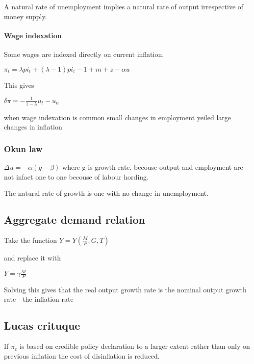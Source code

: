 \documentclass[,twocolumn]{article}
\let\oldparagraph\paragraph
\renewcommand{\paragraph}[1]{\oldparagraph{#1}\mbox{}}
\begin{document}
A natural rate of unemployment implies a natural rate of output
irrespective of money supply.

\hypertarget{wage-indexation}{%
\paragraph{Wage indexation}\label{wage-indexation}}

Some wages are indexed directly on current inflation.

\(\pi_t = \lambda pi_t + (\lambda-1) pi_t-1 + m + z - \alpha u\)

This gives

\(\delta \pi = -\frac{1}{1-\lambda}{u_t - u_n}\)

when wage indexation is common small changes in employment yeiled large
changes in inflation

\hypertarget{okun-law}{%
\subsubsection{Okun law}\label{okun-law}}

\(\Delta u = -\alpha(g - \beta)\) where g is growth rate. becouse output
and employment are not infact one to one becouse of labour hording.

The natural rate of growth is one with no change in unemployment.

\hypertarget{aggregate-demand-relation}{%
\subsection{Aggregate demand relation}\label{aggregate-demand-relation}}

Take the function \(Y = Y(\frac{M}{P},G,T)\)

and replace it with

\(Y = \gamma \frac{M}{P}\)

Solving this gives that the real output growth rate is the nominal
output growth rate - the inflation rate

\hypertarget{lucas-crituque}{%
\subsection{Lucas crituque}\label{lucas-crituque}}

If \(\pi_e\) is based on credible policy declaration to a larger extent
rather than only on previous inflation the cost of disinflation is
reduced.
\end{document}

